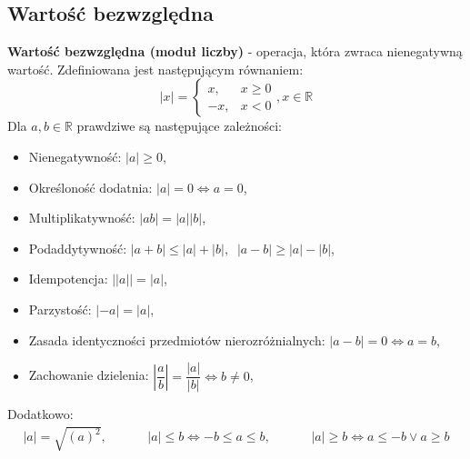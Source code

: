\documentclass[14pt,a4paper]{extarticle}
\begin{document}
\subsection{Wartość bezwzględna}
\textbf{Wartość bezwzględna (moduł liczby)} - operacja, która zwraca nienegatywną wartość. Zdefiniowana jest następującym równaniem:
\begin{equation*}
\lvert x \rvert = \left\{
   \begin{array}{ll}
      x, & x \geq 0 \\
      -x, & x < 0
   \end{array}
\right., x \in \mathbb{R}
\end{equation*}
Dla $a, b \in \mathbb{R}$ prawdziwe są następujące zależności:
\begin{itemize}
   \item Nienegatywność: $\lvert a\rvert \geq 0$,
   \item Określoność dodatnia: $\lvert a \rvert = 0 \Leftrightarrow a = 0$,
   \item Multiplikatywność: $\lvert ab\rvert = \lvert a\rvert\lvert b\rvert$,
   \item Podaddytywność: $\lvert a + b\rvert \leq \lvert a\rvert + \lvert b \rvert,\;\; \lvert a - b\rvert \geq \lvert a\rvert - \lvert b \rvert$,
   \item Idempotencja: $\lvert\lvert a \rvert\rvert = \lvert a \rvert$,
   \item Parzystość: $\lvert -a\rvert = \lvert a\rvert$,
   \item Zasada identyczności przedmiotów nierozróżnialnych: $\lvert a - b \rvert = 0 \Leftrightarrow a = b$,
   \item Zachowanie dzielenia: $\left\lvert\dfrac{a}{b}\right\rvert = \dfrac{\lvert a\rvert}{\lvert b \rvert} \Leftrightarrow b \neq 0$,
\end{itemize}
Dodatkowo:
\begin{equation*}
\begin{array}{ccc}
   \lvert a\rvert = \sqrt{(a)^{2}}, &\hspace{1cm} \lvert a \rvert \leq b \Leftrightarrow -b \leq a \leq b, &\hspace{1cm} \lvert a \rvert \geq b \Leftrightarrow a \leq -b \lor a \geq b \\
\end{array}
\end{equation*}
\end{document}
